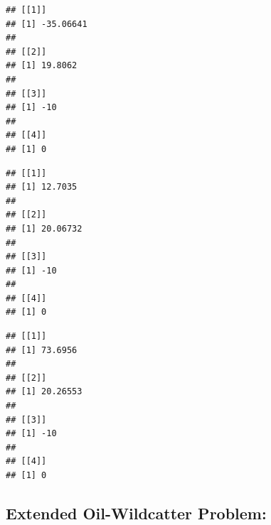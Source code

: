\documentclass[
]{article}
\newenvironment{Shaded}{\begin{snugshade}}{\end{snugshade}}
\newcommand{\ControlFlowTok}[1]{\textcolor[rgb]{0.13,0.29,0.53}{\textbf{#1}}}
\newcommand{\FunctionTok}[1]{\textcolor[rgb]{0.00,0.00,0.00}{#1}}
\newcommand{\NormalTok}[1]{#1}
\newcommand{\SpecialCharTok}[1]{\textcolor[rgb]{0.00,0.00,0.00}{#1}}
\newcommand{\StringTok}[1]{\textcolor[rgb]{0.31,0.60,0.02}{#1}}
\begin{document}
\begin{Shaded}
\end{Shaded}

\begin{verbatim}
## [[1]]
## [1] -35.06641
## 
## [[2]]
## [1] 19.8062
## 
## [[3]]
## [1] -10
## 
## [[4]]
## [1] 0
\end{verbatim}

\begin{Shaded}
\end{Shaded}

\begin{verbatim}
## [[1]]
## [1] 12.7035
## 
## [[2]]
## [1] 20.06732
## 
## [[3]]
## [1] -10
## 
## [[4]]
## [1] 0
\end{verbatim}

\begin{Shaded}
\end{Shaded}

\begin{verbatim}
## [[1]]
## [1] 73.6956
## 
## [[2]]
## [1] 20.26553
## 
## [[3]]
## [1] -10
## 
## [[4]]
## [1] 0
\end{verbatim}

\hypertarget{extended-oil-wildcatter-problem}{%
\subsection{Extended Oil-Wildcatter Problem:}\label{extended-oil-wildcatter-problem}}
\end{document}
